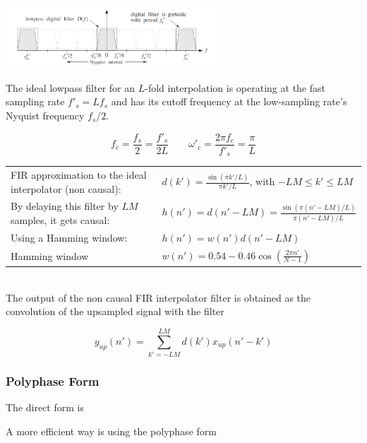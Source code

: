 \begin{center}
	\includegraphics[width=8cm]{images/IntDecOv_Filter.jpg}
\end{center}

The ideal lowpass filter for an $L$-fold interpolation is operating at the fast
sampling rate $f'_s=L f_s$ and has its cutoff frequency at the low-sampling
rate's Nyquist frequency $f_s/2$.

\begin{equation*}
	f_c = \frac{f_s}{2}=\frac{f'_s}{2L}
	\qquad
	\omega'_c = \frac{2\pi f_c}{f'_s}=\frac{\pi}{L}
\end{equation*}

\begin{tabularx}{\linewidth}{Xl}
	FIR approximation to the ideal interpolator (non causal):
	& $d(k')=\frac{\sin(\pi k'/L)}{\pi k'/L}$, with $-LM\leq k'\leq LM$\\
	By delaying this filter by $LM$ samples, it gets causal:
	& $h(n')=d(n'-LM)=\frac{\sin(\pi (n'-LM)/L)}{\pi (n'-LM)/L}$ \\
	Using a Hamming window: & $h(n')=w(n')d(n'-LM)$ \\
	Hamming window & $w(n') = 0.54-0.46\cos(\frac{2\pi n'}{N-1})$ \\
\end{tabularx} \\

The output of the non causal FIR interpolator filter is obtained as the
convolution of the upsampled signal with the filter

\begin{equation*}
	y_{up}(n') = \sum\limits_{k'=-LM}^{LM}d(k')x_{up}(n'-k')
\end{equation*}


\subsubsection{Polyphase Form}

\begin{multicols}{2}
	The direct form is
	\begin{center}
	\end{center}
\vfill\columnbreak
	A more efficient way is using the polyphase form
	\begin{center}
	\end{center}
\end{multicols}

